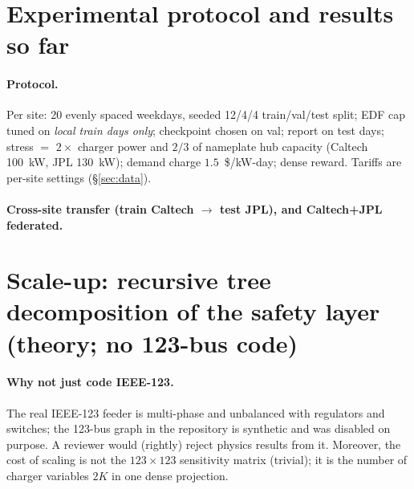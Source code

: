 \documentclass[10pt,a4paper]{article}
\begin{document}
\section{Experimental protocol and results so far}\label{sec:xsite}
\paragraph{Protocol.} Per site: 20 evenly spaced weekdays, seeded 12/4/4 train/val/test split; EDF cap tuned on \emph{local train days
only}; checkpoint chosen on val; report on test days; stress $=$ $2\times$ charger power and $2/3$ of nameplate hub capacity (Caltech 100~kW,
JPL 130~kW); demand charge $1.5$~\$/kW-day; dense reward. Tariffs are per-site settings (\S\ref{sec:data}).

\paragraph{Cross-site transfer (train Caltech $\to$ test JPL), and Caltech+JPL federated.} 

\section{Scale-up: recursive tree decomposition of the safety layer (theory; no 123-bus code)}\label{sec:tree}
\paragraph{Why not just code IEEE-123.} The real IEEE-123 feeder is multi-phase and unbalanced with regulators and switches; the 123-bus graph in the
repository is synthetic and was disabled on purpose. A reviewer would (rightly) reject physics results from it. Moreover, the cost of
scaling is not the $123\times123$ sensitivity matrix (trivial); it is the number of charger variables $2K$ in one dense projection.
\end{document}
